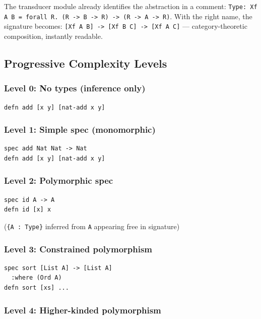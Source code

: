 \documentclass[11pt]{article}
\begin{document}
The transducer module already identifies the abstraction in a comment:
\texttt{Type: Xf A B = forall R. (R -> B -> R) -> (R -> A -> R)}. With the right name,
the signature becomes: \texttt{[Xf A B] -> [Xf B C] -> [Xf A C]} --- category-theoretic
composition, instantly readable.
\subsection{Progressive Complexity Levels}
\label{sec:org0cad009}

\subsubsection{Level 0: No types (inference only)}
\label{sec:orgf108ba9}

\begin{verbatim}
defn add [x y] [nat-add x y]
\end{verbatim}
\subsubsection{Level 1: Simple spec (monomorphic)}
\label{sec:org1f36fc0}

\begin{verbatim}
spec add Nat Nat -> Nat
defn add [x y] [nat-add x y]
\end{verbatim}
\subsubsection{Level 2: Polymorphic spec}
\label{sec:orgb11e810}

\begin{verbatim}
spec id A -> A
defn id [x] x
\end{verbatim}

(\texttt{\{A : Type\}} inferred from \texttt{A} appearing free in signature)
\subsubsection{Level 3: Constrained polymorphism}
\label{sec:orgdaba1b2}

\begin{verbatim}
spec sort [List A] -> [List A]
  :where (Ord A)
defn sort [xs] ...
\end{verbatim}
\subsubsection{Level 4: Higher-kinded polymorphism}
\label{sec:org38b8e50}
\end{document}
